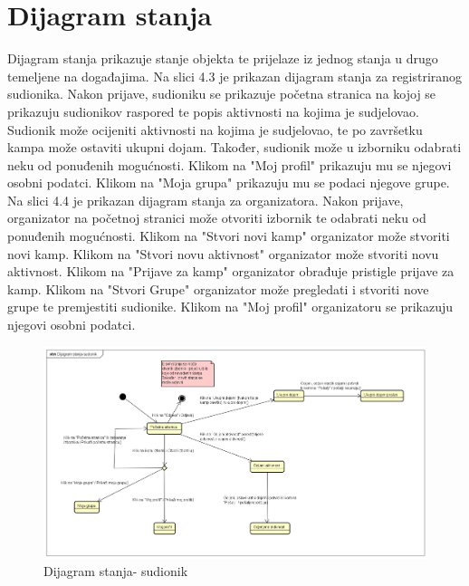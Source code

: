 			\eject
		
		\section{Dijagram stanja}
		
		Dijagram stanja prikazuje stanje objekta te prijelaze iz jednog stanja u drugo temeljene na događajima. Na slici 4.3 je prikazan dijagram stanja za registriranog sudionika. Nakon prijave, sudioniku se prikazuje početna stranica na kojoj se prikazuju sudionikov raspored te popis aktivnosti na kojima je sudjelovao. Sudionik može ocijeniti aktivnosti na kojima je sudjelovao, te po završetku kampa može ostaviti ukupni dojam. Također, sudionik može u izborniku odabrati neku od ponuđenih mogućnosti. Klikom na "Moj profil" prikazuju mu se njegovi osobni podatci. Klikom na "Moja grupa" prikazuju mu se podaci njegove grupe. Na slici 4.4 je prikazan dijagram stanja za organizatora. Nakon prijave, organizator na početnoj stranici može otvoriti izbornik te odabrati neku od ponuđenih mogućnosti. Klikom na "Stvori novi kamp" organizator može stvoriti novi kamp. Klikom na "Stvori novu aktivnost" organizator može stvoriti novu aktivnost. Klikom na "Prijave za kamp" organizator obrađuje pristigle prijave za kamp. Klikom na "Stvori Grupe" organizator može pregledati i stvoriti nove grupe te premjestiti sudionike. Klikom na "Moj profil" organizatoru se prikazuju njegovi osobni podatci.  
		\begin{figure}[H]
			\centerline{\includegraphics[width=\linewidth]{slike/Dijagram_stanja_sudionik.png}}
			\caption{Dijagram stanja- sudionik }
			\label{fig:dijagram_stanja_sudionik}
		\end{figure}
		
		\eject	
		
